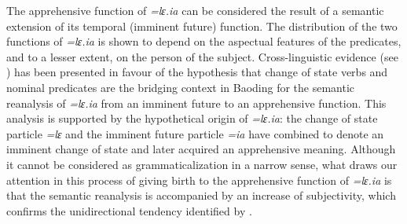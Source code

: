 \documentclass[output=paper,colorlinks,citecolor=brown, language=chinese]{langscibook}
\begin{document}
The apprehensive function of \textit{=lɛ.ia} can be considered the result of a semantic extension of its temporal (imminent future) function. The distribution of the two functions of \textit{=lɛ.ia} is shown to depend on the aspectual features of the predicates, and to a lesser extent, on the person of the subject. Cross-linguistic evidence (see \cite{HeineKuteva2002}) has been presented in favour of the hypothesis that change of state verbs and nominal predicates are the bridging context in Baoding for the semantic reanalysis of \textit{=lɛ.ia} from an imminent future to an apprehensive function. This analysis is supported by the hypothetical origin of \textit{=lɛ.ia}: the change of state particle \textit{=lɛ} and the imminent future particle \textit{=ia} have combined to denote an imminent change of state and later acquired an apprehensive meaning. Although it cannot be considered as grammaticalization in a narrow sense, what draws our attention in this process of giving birth to the apprehensive function of \textit{=lɛ.ia} is that the semantic reanalysis is accompanied by an increase of subjectivity, which confirms the unidirectional tendency identified by \citet{Traugott1989}.
\end{document}
